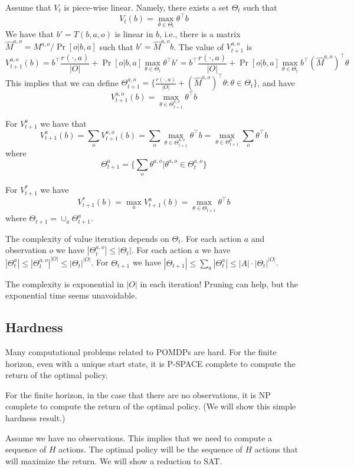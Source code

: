 Assume that $V_t$ is piece-wise linear. Namely, there exists a set
$\Theta_t$ such that
\[
V_t(b)=\max_{\theta\in\Theta_t}\theta^\top b
\]
We have that $b'=T(b,a,o)$ is linear in $b$, i.e.,
there is a matrix $\widehat{M}^{a,o}=M^{a,o}/\Pr[o|b,a]$ such that $b'=\widehat{M}^{a,o} b$. 
The value of $V_{t+1}^{a,o}$ is
\[
V_{t+1}^{a,o}(b)=b^\top\frac{r(\cdot,a)}{|O|}  +\Pr[o|b,a]\max_{\theta\in\Theta_t} \theta^\top b'=b^\top\frac{r(\cdot,a)}{|O|}  +\Pr[o|b,a]
\max_{\theta\in\Theta_t} b^\top (\widehat{M}^{a,o})^\top \theta
\]
This implies that we can define $\Theta_{t+1}^{a,o}=\{\frac{r(\cdot,a)}{|O|}+
(\widehat{M}^{a,o})^\top\theta:\theta \in \Theta_t\}$, and have
\[
V_{t+1}^{a,o}(b)= \max_{\theta\in\Theta_{t+1}^{a,o}}
\theta^\top b
\]

For $V^a_{t+1}$ we have that
\[
V_{t+1}^a(b)=\sum_o V_{t+1}^{a,o}(b)=\sum_o \max_{\theta\in\Theta_{t+1}^{a,o}}
\theta^\top b=\max_{\theta\in\Theta_{t+1}^{a}}\sum_o  \theta^\top b
\]
where
\[
\Theta^a_{t+1}=\{\sum_o
\theta^{a,o}|\theta^{a,o}\in\Theta^{a,o}_t\}
\]

For $V_{t+1}^*$ we have
\[
V^*_{t+1}(b)=\max_a V_{t+1}^a(b)=\max_{\theta\in\Theta_{t+1}}
\theta^\top b
\]
where $\Theta_{t+1}=\cup_a \Theta^a_{t+1}$.
%

The complexity of value iteration depends on $\Theta_t$. For each
action $a$ and observation $o$ we have $|\Theta^{a,o}_t|\leq
|\Theta_t|$. For each action $a$ we have $|\Theta^a_t|\leq
{|\Theta^{a,o}_t|}^{|O|}\leq {|\Theta_t|}^{|O|}$. For $\Theta_{t+1}$
we have $|\Theta_{t+1}|\leq \sum_a |\Theta_t^a|\leq |A|\cdot
|\Theta_t|^{|O|}$.

The complexity is exponential in $|O|$ in each iteration! Pruning
can help, but the exponential time seems unavoidable.

\subsection{Hardness}

Many computational problems related to POMDPs are hard. For the
finite horizon, even with a unique start state, it is P-SPACE
complete to compute the return of the optimal policy.

For the finite horizon, in the case that there are no observations,
it is NP complete to compute the return of the optimal policy. (We
will show this simple hardness result.)

Assume we have no observations. This implies that we need to compute
a sequence of $H$ actions. The optimal policy will be the sequence
of $H$ actions that will maximize the return. We will show a
reduction to SAT.

